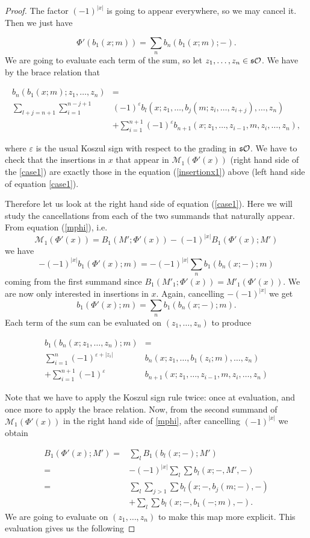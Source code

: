\documentclass[Thesis.tex]{subfiles}
\begin{document}
\begin{proof}
The factor $(-1)^{|x|}$ is going to appear everywhere, so we may cancel it. Then we just have

\[\Phi'(b_1(x;m))=\sum_n b_n(b_1(x;m);-).\]
We are going to evaluate each term of the sum, so let $z_1,\dots, z_n\in \mathfrak{s}{\mathcal O}$. We have by the brace relation that

\begin{align}\label{insertionx1}
b_n(b_1(x;m);z_1,\dots, z_n)&=\\
 \sum_{l+j=n+1}\sum_{i=1}^{n-j+1}&(-1)^{\varepsilon} b_l(x;z_1,\dots,b_j(m;z_{i},\dots, z_{i+j}),\dots, z_n)\nonumber\\
 &+\sum_{i=1}^{n+1}(-1)^{\varepsilon}b_{n+1}(x;z_1,\dots, z_{i-1},m,z_i,\dots, z_n),\nonumber
\end{align}

where $\varepsilon$ is the usual Koszul sign with respect to the grading in $\mathfrak{s}{\mathcal O}$. We have to check that the insertions in $x$ that appear in $\mathcal{M}_1(\Phi'(x))$ (right hand side of the \cref{case1}) are exactly those in the equation (\ref{insertionx1}) above (left hand side of equation \cref{case1}).

Therefore let us look at the right hand side of equation (\ref{case1}). Here we will study the cancellations from each of the two summands that naturally appear. From equation (\ref{mphi}), i.e. \[\mathcal{M}_1(\Phi'(x))=B_1(M';\Phi'(x))-(-1)^{|x|}B_1(\Phi'(x);M')\]  we have 
\[-(-1)^{|x|}b_1(\Phi'(x);m)=-(-1)^{|x|}\sum_n b_1(b_n(x;-);m)\] 
coming from the first summand since $B_1(M'_1;\Phi'(x))=M'_1(\Phi'(x))$. We are now only interested in insertions in $x$. Again, cancelling $-(-1)^{|x|}$ we get
\[b_1(\Phi'(x);m)=\sum_n b_1(b_n(x;-);m).\] 
Each term of the sum can be evaluated on $(z_1,\dots, z_n)$ to produce

\begin{align}\label{insertionx2}
b_1(b_n(x;z_1, \dots, z_n);m)&=\\
\sum_{i=1}^n (-1)^{\varepsilon+|z_i|}&b_n(x;z_1,\dots, b_1(z_i;m),\dots, z_n)\\
+\sum_{i=1}^{n+1} (-1)^{\varepsilon}&b_{n+1}(x;z_1,\dots, z_{i-1},m,z_{i},\dots, z_n)\nonumber
\end{align}

Note that we have to apply the Koszul sign rule twice: once at evaluation, and once more to apply the brace relation. Now, from the second summand of $\mathcal{M}_1(\Phi'(x))$ in the right hand side of \cref{mphi}, after cancelling $(-1)^{|x|}$ we obtain 


\begin{align*}
B_1(\Phi'(x);M')=&\sum_l B_1(b_l(x;-);M')\\
=&-(-1)^{|x|}\sum_l\sum b_l(x;-,M',-) \\
=& \sum_l\sum_{j> 1}\sum b_l(x;-,b_j(m;-),-)\\
&+\sum_l\sum b_l(x;-,b_1(-;m),-).
\end{align*}
We are going to evaluate on $(z_1,\dots, z_n)$ to make this map more explicit. This evaluation gives us the following
 

\end{proof}
\end{document}
